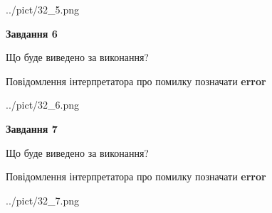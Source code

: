 \documentclass[10pt, ukrainian]{article}
\begin{document}
{\begin {large}
\begin{center}
	{../pict/32_5.png}
\end{center}
\newpage

{\begin {center}\textbf{Завдання 6}\end {center}}\par
Що буде виведено за виконання? \par
Повідомлення інтерпретатора про помилку позначати \textbf{error}

\begin{center}
	{../pict/32_6.png}
\end{center}
\newpage

{\begin {center}\textbf{Завдання 7}\end {center}}\par
Що буде виведено за виконання? \par
Повідомлення інтерпретатора про помилку позначати \textbf{error}

\begin{center}
	{../pict/32_7.png}
\end{center}
\newpage

\end {large}}
\end{document}
